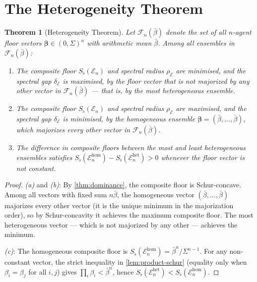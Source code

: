 \documentclass[twocolumn,11pt,a4paper]{article}
\newtheorem{theorem}{Theorem}[section]
\theoremstyle{remark}
\newcommand{\Sflat}{S_{\flat}}
\newcommand{\Ens}{\mathcal{E}}
\newcommand{\srad}{\rho}                  %
\newcommand{\sgap}{\delta}                %
\begin{document}
\section{The Heterogeneity Theorem}
\label{sec:heterogeneity}

\begin{theorem}[Heterogeneity Theorem]
\label{thm:heterogeneity}
Let $\mathcal{F}_n(\bar\beta)$ denote the set of all $n$-agent floor vectors
$\boldsymbol\beta \in (0,\Sigma)^n$ with arithmetic mean $\bar\beta$.
Among all ensembles in $\mathcal{F}_n(\bar\beta)$:
\begin{enumerate}[label=\textup{(\alph*)}]
\item The composite floor $\Sflat(\Ens_n)$ and spectral radius
  $\srad_\Ens$ are minimised, and the spectral gap $\sgap_\Ens$ is maximised,
  by the floor vector that is not majorized by any other vector in
  $\mathcal{F}_n(\bar\beta)$ — that is, by the most heterogeneous ensemble.
\item The composite floor $\Sflat(\Ens_n)$ and spectral radius
  $\srad_\Ens$ are maximised, and the spectral gap $\sgap_\Ens$ is minimised,
  by the homogeneous ensemble $\boldsymbol\beta = (\bar\beta,\ldots,\bar\beta)$,
  which majorizes every other vector in $\mathcal{F}_n(\bar\beta)$.
\item The difference in composite floors between the most and least
  heterogeneous ensembles satisfies
  $\Sflat(\Ens_n^{\mathrm{hom}}) - \Sflat(\Ens_n^{\mathrm{het}}) > 0$
  whenever the floor vector is not constant.
\end{enumerate}
\end{theorem}
\begin{proof}
\textit{(a)} and \textit{(b)}:
By \cref{thm:dominance}, the composite floor is Schur-concave.  Among all
vectors with fixed sum $n\bar\beta$, the homogeneous vector
$(\bar\beta,\ldots,\bar\beta)$ majorizes every other vector (it is the unique
minimum in the majorization order), so by Schur-concavity it achieves the
maximum composite floor.  The most heterogeneous vector — which is not
majorized by any other — achieves the minimum.

\textit{(c)}:  The homogeneous composite floor is
$\Sflat(\Ens_n^{\mathrm{hom}}) = \bar\beta^n/\Sigma^{n-1}$.  For any
non-constant vector, the strict inequality in \cref{lem:product-schur}
(equality only when $\beta_i=\beta_j$ for all $i,j$) gives
$\prod_i \beta_i < \bar\beta^n$, hence
$\Sflat(\Ens_n^{\mathrm{het}}) < \Sflat(\Ens_n^{\mathrm{hom}})$.
\end{proof}
\end{document}
